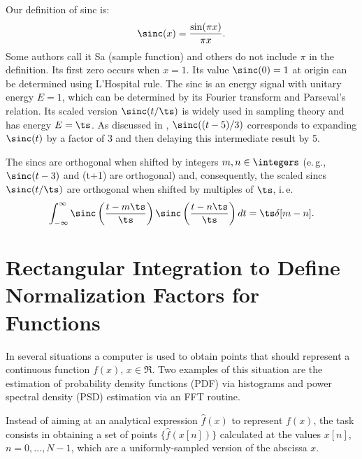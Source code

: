 Our definition of sinc is:
\[
\sinc(x) = \frac{\sin(\pi x)}{\pi x}.
\]
Some authors call it Sa (sample function) and others do not include $\pi$ in the definition. Its first zero occurs when $x=1$. Its value $\sinc(0)=1$ at origin can be determined using L'Hospital rule. The sinc is an energy signal with unitary energy $E=1$, which can be determined by its Fourier transform and Parseval's relation. Its scaled version $\sinc(t/\ts)$ is widely used in sampling theory and has energy $E=\ts$. As discussed in , $\sinc( (t-5)/3)$ corresponds 
to expanding $\sinc(t)$ by a factor of 3 and then delaying this intermediate result by 5.

The sincs are orthogonal when shifted by integers $m,n \in \integers$ (e.\,g., $\sinc(t-3)$ and \sinc(t+1) are orthogonal) and, consequently, the scaled sincs $\sinc(t/\ts)$ are orthogonal when shifted by multiples of $\ts$, i.\,e.
\begin{equation}
\int_{-\infty}^{\infty} \sinc\left(\frac{t-m\ts}{\ts} \right) \sinc\left(\frac{t-n\ts}{\ts} \right) dt = \ts \delta[m-n].
\label{eq:sincOrthogonality}
\end{equation}

\section{Rectangular Integration to Define Normalization Factors for Functions}
\label{sec:normalization_factors_psd_pdf}

In several situations a computer is used to obtain points that should represent a continuous function $f(x)$, $x \in \Re$. Two examples of this situation are the estimation of probability density functions (PDF) via histograms and power spectral density (PSD) estimation via an FFT routine. 

Instead of aiming at an analytical expression $\hat f(x)$ to represent $f(x)$, the task consists in obtaining a set of points $\{ \hat f(x[n]) \}$ calculated at the values $x[n]$, $n=0,\ldots,N-1$, which are a uniformly-sampled version of the abscissa $x$.

